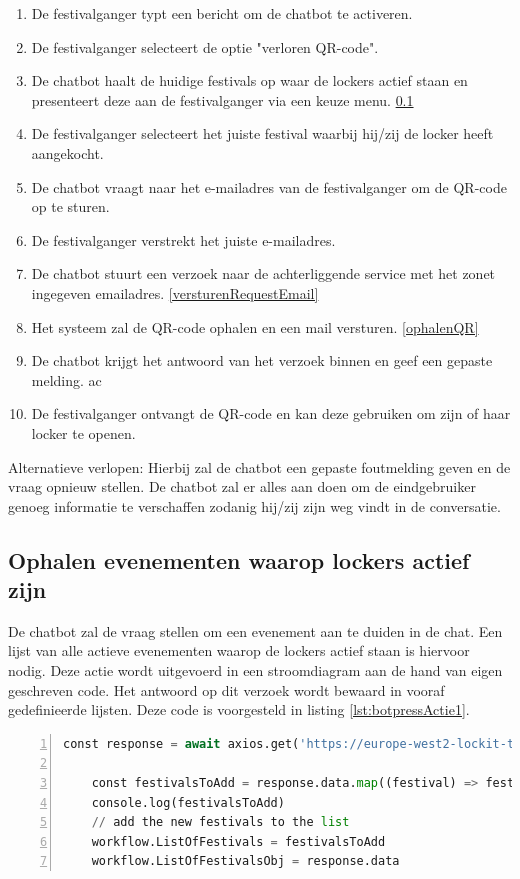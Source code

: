 \begin{enumerate}
    \item De festivalganger typt een bericht om de chatbot te activeren.
    \item De festivalganger selecteert de optie "verloren QR-code".
    \item De chatbot haalt de huidige festivals op waar de lockers actief staan en presenteert deze aan de festivalganger via een keuze menu. \ref{ophalenActieveFestivals}
    \item De festivalganger selecteert het juiste festival waarbij hij/zij de locker heeft aangekocht.
    \item De chatbot vraagt naar het e-mailadres van de festivalganger om de QR-code op te sturen.
    \item De festivalganger verstrekt het juiste e-mailadres.
    \item De chatbot stuurt een verzoek naar de achterliggende service met het zonet ingegeven emailadres. \ref{versturenRequestEmail}
    \item Het systeem zal de QR-code ophalen en een mail versturen. \ref{ophalenQR}
    \item De chatbot krijgt het antwoord van het verzoek binnen en geef een gepaste melding.
ac
    \item De festivalganger ontvangt de QR-code en kan deze gebruiken om zijn of haar locker te openen.
\end{enumerate}

Alternatieve verlopen:
\newline
Hierbij zal de chatbot een gepaste foutmelding geven en de vraag opnieuw stellen. De chatbot zal er alles aan doen om de eindgebruiker genoeg informatie te verschaffen zodanig hij/zij zijn weg vindt in de conversatie.

\subsection{Ophalen evenementen waarop lockers actief zijn}
\label{ophalenActieveFestivals}
De chatbot zal de vraag stellen om een evenement aan te duiden in de chat. Een lijst van alle actieve evenementen waarop de lockers actief staan is hiervoor nodig. Deze actie wordt uitgevoerd in een stroomdiagram aan de hand van eigen geschreven code. Het antwoord op dit verzoek wordt bewaard in vooraf gedefinieerde lijsten. Deze code is voorgesteld in listing \ref{lst:botpressActie1}.

\begin{lstlisting}[language=Python, caption={Code blok geschreven in javascript om een actie van botpress uit te voeren.}, label=lst:botpressActie1, numbers=left]
    const response = await axios.get('https://europe-west2-lockit-testing.cloudfunctions.net/getActiveShops')
    
    const festivalsToAdd = response.data.map((festival) => festival.name)
    console.log(festivalsToAdd)
    // add the new festivals to the list
    workflow.ListOfFestivals = festivalsToAdd
    workflow.ListOfFestivalsObj = response.data
\end{lstlisting}


